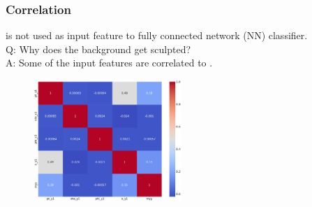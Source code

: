 \documentclass[11pt,xcolor=dvipsnames,aspectratio=169]{beamer}
\newcommand{\backupend}{
   \addtocounter{framenumberappendix}{-\value{framenumber}}
   \addtocounter{framenumber}{\value{framenumberappendix}} 
}
\begin{document}
\begin{frame}
  \frametitle{\bf Correlation}
   \myy{} is not used as input feature to fully connected network (NN)
   classifier.\\ 
   Q: Why does the background get sculpted?\\
   A: Some of the input features are correlated to \myy{}.
  \begin{figure}
    \centering
    \includegraphics[width=0.5\textwidth]{figures/l2/lect_plots/corr_noscale.pdf}
  \end{figure}

\end{frame}

\backupend
\end{document}
